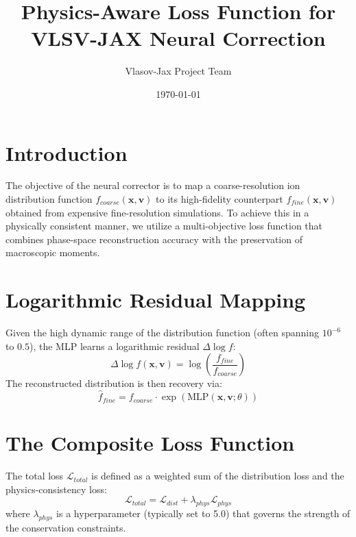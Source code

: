 \documentclass[11pt]{article}
\title{Physics-Aware Loss Function for VLSV-JAX Neural Correction}
\author{Vlasov-Jax Project Team}
\date{\today}
\begin{document}
\maketitle

\section{Introduction}
The objective of the neural corrector is to map a coarse-resolution ion distribution function $f_{coarse}(\mathbf{x}, \mathbf{v})$ to its high-fidelity counterpart $f_{fine}(\mathbf{x}, \mathbf{v})$ obtained from expensive fine-resolution simulations. To achieve this in a physically consistent manner, we utilize a multi-objective loss function that combines phase-space reconstruction accuracy with the preservation of macroscopic moments.

\section{Logarithmic Residual Mapping}
Given the high dynamic range of the distribution function (often spanning $10^{-6}$ to $0.5$), the MLP learns a logarithmic residual $\Delta \log f$:
\begin{equation}
    \Delta \log f(\mathbf{x}, \mathbf{v}) = \log\left( \frac{f_{fine}}{f_{coarse}} \right)
\end{equation}
The reconstructed distribution is then recovery via:
\begin{equation}
    \hat{f}_{fine} = f_{coarse} \cdot \exp\left( \text{MLP}(\mathbf{x}, \mathbf{v}; \theta) \right)
\end{equation}

\section{The Composite Loss Function}
The total loss $\mathcal{L}_{total}$ is defined as a weighted sum of the distribution loss and the physics-consistency loss:
\begin{equation}
    \mathcal{L}_{total} = \mathcal{L}_{dist} + \lambda_{phys} \mathcal{L}_{phys}
\end{equation}
where $\lambda_{phys}$ is a hyperparameter (typically set to 5.0) that governs the strength of the conservation constraints.
\end{document}
